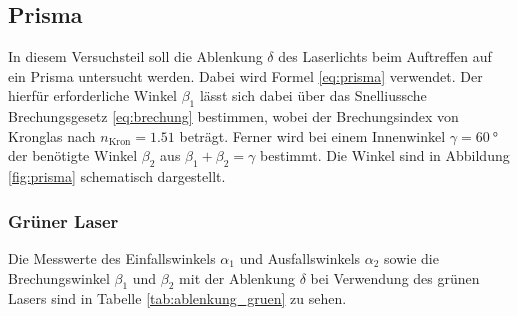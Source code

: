 





\subsection{Prisma}
In diesem Versuchsteil soll die Ablenkung $\delta$ des Laserlichts beim Auftreffen auf ein Prisma untersucht werden.
Dabei wird Formel \eqref{eq:prisma} verwendet.
Der hierfür erforderliche Winkel $\beta_1$ lässt sich dabei über das Snelliussche Brechungsgesetz \eqref{eq:brechung} bestimmen,
wobei der Brechungsindex von Kronglas nach \cite[]{brechungsindex} $n_\text{Kron} = \num[]{1.51}$ beträgt.
Ferner wird bei einem Innenwinkel $\gamma = \qty[]{60}{\degree}$ der benötigte Winkel $\beta_2$ aus $\beta_1 + \beta_2 = \gamma$ bestimmt.
Die Winkel sind in Abbildung \ref{fig:prisma} schematisch dargestellt.


\subsubsection{Grüner Laser}
Die Messwerte des Einfallswinkels $\alpha_1$ und Ausfallswinkels $\alpha_2$ sowie
die Brechungswinkel $\beta_1$ und $\beta_2$ mit der Ablenkung $\delta$ bei Verwendung des grünen Lasers sind in Tabelle \ref{tab:ablenkung_gruen} zu sehen.

